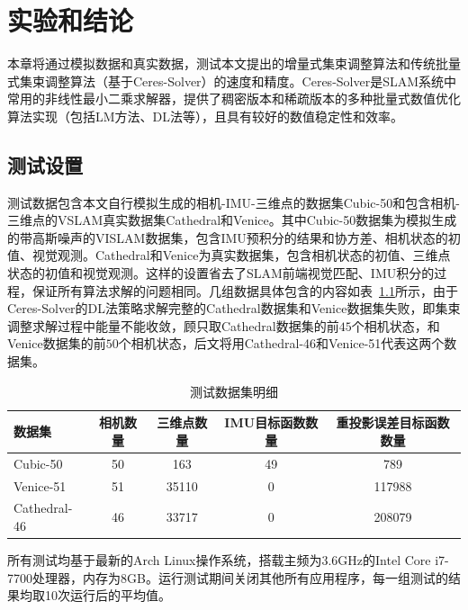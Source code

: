 \chapter{实验和结论}\label{ch:exp}

本章将通过模拟数据和真实数据，测试本文提出的增量式集束调整算法和传统批量式集束调整算法（基于Ceres-Solver）的速度和精度。Ceres-Solver是SLAM系统中常用的非线性最小二乘求解器，提供了稠密版本和稀疏版本的多种批量式数值优化算法实现（包括LM方法、DL法等），且具有较好的数值稳定性和效率。

\section{测试设置}

测试数据包含本文自行模拟生成的相机-IMU-三维点的数据集Cubic-50和包含相机-三维点的VSLAM真实数据集Cathedral\citep{kim2014influence}和Venice\citep{kummerle2011g}。其中Cubic-50数据集为模拟生成的带高斯噪声的VISLAM数据集，包含IMU预积分的结果和协方差、相机状态的初值、视觉观测。Cathedral和Venice为真实数据集，包含相机状态的初值、三维点状态的初值和视觉观测。这样的设置省去了SLAM前端视觉匹配、IMU积分的过程，保证所有算法求解的问题相同。几组数据具体包含的内容如表~\ref{tab:dataset}所示，由于Ceres-Solver的DL法策略求解完整的Cathedral数据集和Venice数据集失败，即集束调整求解过程中能量不能收敛，顾只取Cathedral数据集的前$45$个相机状态，和Venice数据集的前$50$个相机状态，后文将用Cathedral-46和Venice-51代表这两个数据集。

{
\linespread{1}
\begin{table}[htb!]
\caption{测试数据集明细}
\label{tab:dataset}
\centering
\begin{tabular}{l|cccc}
    \toprule
    数据集       & 相机数量 & 三维点数量 & IMU目标函数数量 & 重投影误差目标函数数量 \\ \midrule
    Cubic-50     &       50 &        163 &              49 &                    789 \\
    Venice-51    &       51 &      35110 &               0 &                 117988 \\
    Cathedral-46 &       46 &      33717 &               0 &                 208079 \\
    \bottomrule
\end{tabular}
\end{table}
}

所有测试均基于最新的Arch Linux操作系统，搭载主频为3.6GHz的Intel Core i7-7700处理器，内存为8GB。运行测试期间关闭其他所有应用程序，每一组测试的结果均取10次运行后的平均值。

